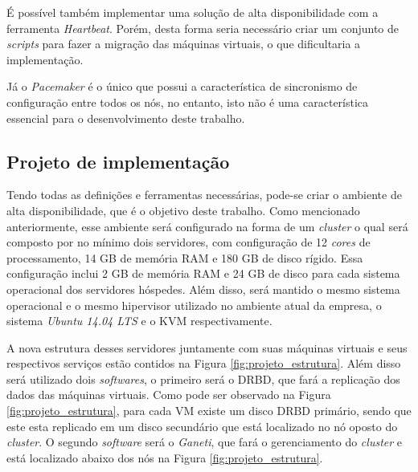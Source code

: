 É possível também implementar uma solução de alta disponibilidade com a ferramenta \textit{Heartbeat}. Porém, desta forma seria necessário criar 
um conjunto de \textit{scripts} para fazer a migração das máquinas virtuais, o que dificultaria a implementação.

Já o \textit{Pacemaker} é o único que possui a característica de sincronismo de configuração entre todos os nós, no entanto, isto não é uma
característica essencial para o desenvolvimento deste trabalho.


\subsection{Projeto de implementação}
\label{section:projetoimpl}

Tendo todas as definições e ferramentas necessárias, pode-se criar o ambiente de alta disponibilidade, que é o objetivo deste trabalho.
Como mencionado anteriormente, esse ambiente será configurado na forma de um \textit{cluster} o qual será composto por no mínimo dois servidores, 
com configuração de 12 \textit{cores} de processamento, 14 GB de memória \ac{RAM} e 180 GB de disco rígido. Essa configuração inclui
2 GB de memória \ac{RAM} e 24 GB de disco para cada sistema operacional dos servidores hóspedes. Além disso, será mantido o mesmo sistema 
operacional e o mesmo hipervisor utilizado no ambiente atual da empresa, o sistema \textit{Ubuntu 14.04 \ac{LTS}} e o \ac{KVM} \cite{kvm} 
respectivamente.

A nova estrutura desses servidores juntamente com suas máquinas virtuais e seus respectivos serviços estão contidos na Figura 
\ref{fig:projeto_estrutura}. Além disso será utilizado dois \textit{softwares}, o primeiro será o \ac{DRBD}, que fará a replicação dos dados 
das máquinas virtuais. Como pode ser observado na Figura \ref{fig:projeto_estrutura}, para cada \ac{VM} existe um disco \ac{DRBD} primário, 
sendo que este esta replicado em um disco secundário que está localizado no nó oposto do \textit{cluster}. O segundo \textit{software} será o 
\textit{Ganeti}, que fará o gerenciamento do \textit{cluster} e está localizado abaixo dos nós na Figura \ref{fig:projeto_estrutura}.

